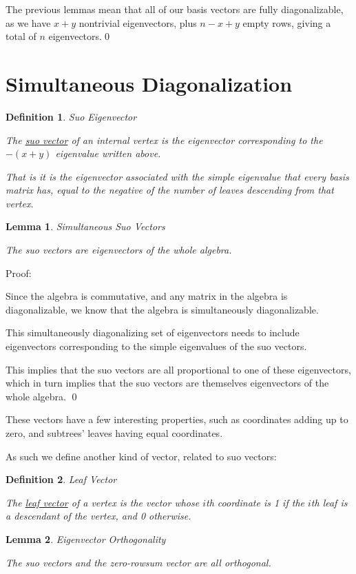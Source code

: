\documentclass[10pt,a4paper]{report}
\newtheorem{definition}{Definition}
\newtheorem{lemma}{Lemma}
\begin{document}
The previous lemmas mean that all of our basis vectors are fully
diagonalizable, as we have $x+y$ nontrivial eigenvectors, plus $n-x+y$ empty
rows, giving a total of $n$ eigenvectors.\qed

\section{Simultaneous Diagonalization}

\begin{definition} Suo Eigenvector

	The \underline{suo vector} of an internal vertex is the eigenvector corresponding to
	the $-(x+y)$ eigenvalue written above.

	That is it is the eigenvector associated with the simple eigenvalue that
	every basis matrix has, equal to the negative of the number of leaves
	descending from that vertex.
\end{definition}

\begin{lemma} Simultaneous Suo Vectors

	The suo vectors are eigenvectors of the whole algebra.
\end{lemma}
Proof:

Since the algebra is commutative, and any matrix in the algebra is
diagonalizable, we know that the algebra is simultaneously diagonalizable.

This simultaneously diagonalizing set of eigenvectors needs to include
eigenvectors corresponding to the simple eigenvalues of the suo vectors.

This implies that the suo vectors are all proportional to one of these
eigenvectors, which in turn implies that the suo vectors are themselves
eigenvectors of the whole algebra. \qed

These vectors have a few interesting properties, such as coordinates adding up
to zero, and subtrees' leaves having equal coordinates.

As such we define another kind of vector, related to suo vectors:

\begin{definition} Leaf Vector

	The \underline{leaf vector} of a vertex is the vector whose $i$th coordinate is 1 if the
	$i$th leaf is a descendant of the vertex, and 0 otherwise.
\end{definition}

\begin{lemma} Eigenvector Orthogonality

	The suo vectors and the zero-rowsum vector are all orthogonal.
\end{lemma}
\end{document}
